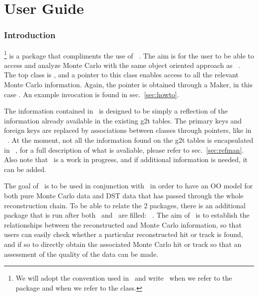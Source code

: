 %
%
\tableofcontents
\cleardoublepage

%
%
\part{User Guide}
\clearpage


\section{Introduction}

\StMcEvent\footnote{We will adopt the convention used in \StEvent\ 
    and write \StMcEvent\ when we refer to the package and
     when we refer to the class.} is a package that
compliments the use of \StEvent\ . The aim is for the user to be able
to access and analyze Monte Carlo with the same object oriented
approach as \StEvent\ . The top class is , and a
pointer to this  class enables access to all the relevant Monte Carlo
information.  Again, the pointer is obtained through a Maker, in this
case \name{StMcEventMaker}.  An example invocation is found in sec.~\ref{sec:howto}.

The information contained in \StMcEvent\ is designed to be simply
a reflection of the information already available in the existing
g2t tables.  The primary keys and foreign keys are replaced by
associations between classes through pointers, like in \StEvent\ .
At the moment, not all the information found on the g2t tables is
encapsulated in \StMcEvent\ , for a full description of what is
avaliable, please refer to sec.~\ref{sec:refman}.  Also note that
\StMcEvent\ is a work in progress, and if additional information
is needed, it can be added.

The goal of \StMcEvent\ is to be used in conjunction with \StEvent\ in
order to have an OO model for both pure Monte Carlo data and DST data
that has passed through the whole reconstruction chain.  To be able
to relate the 2 packages, there is an additional package that is
run after both \StEvent\ and \StMcEvent\ are filled: \StAssociationMaker\ .
\index{StAssociationMaker}
The aim of \StAssociationMaker\ is to establish the relationships
between the reconstructed and Monte Carlo information, so that
users can easily check whether a particular reconstructed hit or
track is found, and if so to directly obtain the associated Monte
Carlo hit or track so that an assessment of the quality of the
data can be made.

